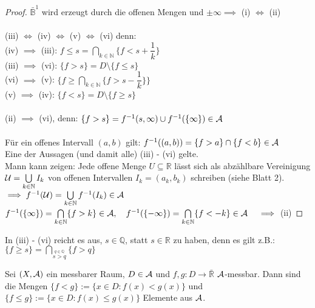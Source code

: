  \begin{proof}
    $\bar{\mathbb{B}}^1$ wird erzeugt durch die offenen Mengen und $\pm \infty \implies$ (i) $\Leftrightarrow$ (ii)\\
    \\
    (iii) $\Leftrightarrow$ (iv) $\Leftrightarrow$ (v) $\Leftrightarrow$ (vi) denn:\\
    (iv) $\implies$ (iii): ${f \leq s} = \bigcap\limits_{k \in \mathbb{N}} \{f < s + \dfrac{1}{k}\}$\\
    (iii) $\implies$ (vi): $\{f > s\} = D \setminus \{f \leq s\}$\\
    (vi) $\implies$ (v): $\{f \geq \bigcap\limits_{k \in \mathbb{N}} \{f > s - \dfrac{1}{k}\}\}$\\
    (v) $\implies$ (iv): $\{f < s\} = D \setminus \{f \geq s\}$\\
    \\
    (ii) $\implies$ (vi), denn: $\{f > s\} = f^{-1}(s,\infty) \cup f^{-1}(\{\infty\}) \in \mathcal{A}$\\
    \\
    Für ein offenes Intervall $(a,b)$ gilt: $f^{-1}((a,b)) = \{f > a\} \cap \{f < b\} \in \mathcal{A}$\\
    Eine der Aussagen (und damit alle) (iii) - (vi) gelte.\\
    Mann kann zeigen: Jede offene Menge $U \subseteq \mathbb{R}$ lässt sich als abzählbare Vereinigung $\mathcal{U} = \bigcup\limits_{k \in \mathbb{N}} I_k$ von offenen Intervallen $I_k = (a_k, b_k)$ schreiben (siehe Blatt 2).\\
    $\implies f^{-1}(\mathcal{U}) = \bigcup\limits_{k \in \mathbb{N}} f^{-1}(I_k) \in \mathcal{A}$\\
    $f^{-1}(\{\infty\}) = \bigcap\limits_{k \in \mathbb{N}} \{f > k\} \in \script{A}, \ \ \ f^{-1}(\{-\infty\}) = \bigcap\limits_{k \in \mathbb{N}} \{f < -k\} \in \script{A} \ \ \ \implies$ (ii)
  \end{proof}

  \begin{remark}
    In (iii) - (vi) reicht es aus, $s \in \mathbb{Q}$, statt $s \in \mathbb{R}$ zu haben, denn es gilt z.B.:\\
    $\{f \geq s\} = \bigcap\limits_{\stackrel{q \in \mathbb{Q}}{s > q}} \{f > q\}$
  \end{remark}


  \begin{lemma}
    Sei $(X, \mathcal{A})$ ein messbarer Raum, $D \in \mathcal{A}$ und $f,g: D \to \bar{\mathbb{R}}$ $\mathcal{A}$-messbar. Dann sind die Mengen $\{f < g\} := \{x \in D: f(x) < g(x)\}$ und $\{f \leq g\} := \{x \in D: f(x) \leq g(x)\}$ Elemente aus $\mathcal{A}$.
  \end{lemma}

